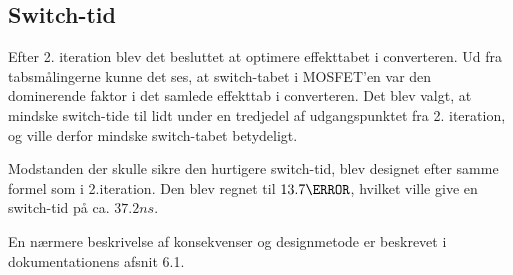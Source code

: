 
\subsection{Switch-tid}
Efter 2. iteration blev det besluttet at optimere effekttabet i converteren. Ud fra tabsmålingerne kunne det ses, at switch-tabet i MOSFET'en var den dominerende faktor i det samlede effekttab i converteren. Det blev valgt, at mindske switch-tide til lidt under en tredjedel af udgangspunktet fra 2. iteration, og ville derfor mindske switch-tabet betydeligt.

Modstanden der skulle sikre den hurtigere switch-tid, blev designet efter samme formel som i 2.iteration. Den blev regnet til $13.7\ohm$, hvilket ville give en switch-tid på ca. $37.2ns$. 

En nærmere beskrivelse af konsekvenser og designmetode er beskrevet i dokumentationens afsnit 6.1.